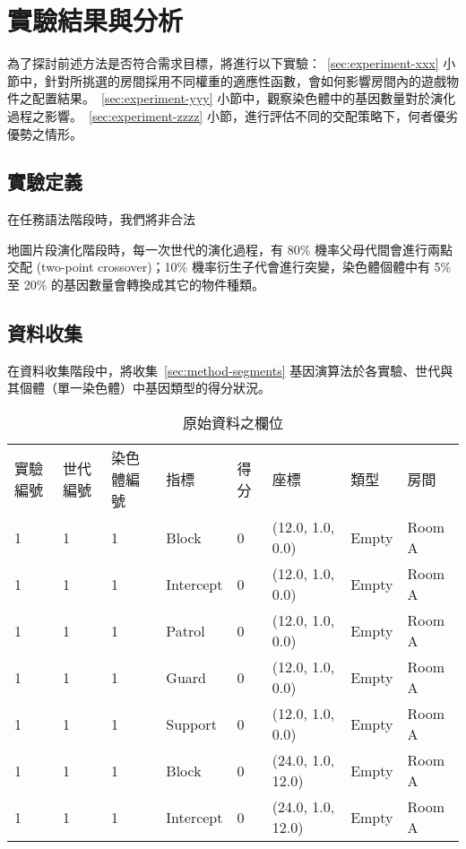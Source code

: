 \renewcommand\thetable{\arabic{chapter}-\arabic{table}}
\chapter{實驗結果與分析}
\label{cha:experiment}

為了探討前述方法是否符合需求目標，將進行以下實驗：~\ref{sec:experiment-xxx} 小節中，針對所挑選的房間採用不同權重的適應性函數，會如何影響房間內的遊戲物件之配置結果。~\ref{sec:experiment-yyy} 小節中，觀察染色體中的基因數量對於演化過程之影響。~\ref{sec:experiment-zzzz} 小節，進行評估不同的交配策略下，何者優劣優勢之情形。

\section{實驗定義}
\label{sec:experiment-definition}

在任務語法階段時，我們將非合法

地圖片段演化階段時，每一次世代的演化過程，有 80\% 機率父母代間會進行兩點交配 (two-point crossover)；10\% 機率衍生子代會進行突變，染色體個體中有 5\% 至 20\% 的基因數量會轉換成其它的物件種類。

\section{資料收集}
\label{sec:experiment-datacollection}

在資料收集階段中，將收集~\ref{sec:method-segments} 基因演算法於各實驗、世代與其個體（單一染色體）中基因類型的得分狀況。

\begin{table}[h]
  \centering
  \caption{原始資料之欄位}
  \label{tbl:structure-of-rawdata}
  \bigskip
  \begin{tabular}{| l | l | l | l | l | l | l | l |}
    \hline
    實驗編號 & 世代編號 & 染色體編號 & 指標 & 得分 & 座標 & 類型 & 房間 \\
    1 & 1 & 1 & Block     & 0 & (12.0, 1.0, 0.0)  & Empty & Room A \\
    1 & 1 & 1 & Intercept & 0 & (12.0, 1.0, 0.0)  & Empty & Room A \\
    1 & 1 & 1 & Patrol    & 0 & (12.0, 1.0, 0.0)  & Empty & Room A \\
    1 & 1 & 1 & Guard     & 0 & (12.0, 1.0, 0.0)  & Empty & Room A \\
    1 & 1 & 1 & Support   & 0 & (12.0, 1.0, 0.0)  & Empty & Room A \\
    1 & 1 & 1 & Block     & 0 & (24.0, 1.0, 12.0) & Empty & Room A \\
    1 & 1 & 1 & Intercept & 0 & (24.0, 1.0, 12.0) & Empty & Room A \\
    \hline
  \end{tabular}
\end{table}

